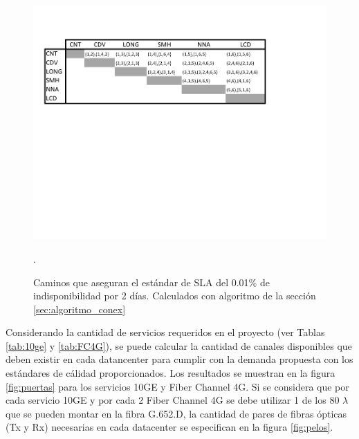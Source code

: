 \begin{figure}[H]
  \centering
  \includegraphics[width=13cm]{Imagenes/caminos.pdf}
  \caption[Caminos calculados por algoritmo de disponibilidad]{Caminos que aseguran el estándar de SLA del 0.01\% de indisponibilidad por 2 días. Calculados con algoritmo de la sección \ref{sec:algoritmo_conex}}.
  \label{fig:caminos}
\end{figure}

Considerando la cantidad de servicios requeridos en el proyecto (ver Tablas \ref{tab:10ge} y \ref{tab:FC4G}), se puede calcular la cantidad de canales disponibles que deben existir en cada datancenter para cumplir con la demanda propuesta con los estándares de cálidad proporcionados. Los resultados se muestran en la figura \ref{fig:puertas} para los servicios 10GE y Fiber Channel 4G. Si se considera que por cada servicio 10GE y por cada 2 Fiber Channel 4G se debe utilizar 1 de los 80 $\lambda$ que se pueden montar en la fibra G.652.D, la cantidad de pares de fibras ópticas (Tx y Rx) necesarias en cada datacenter se especifican en la figura \ref{fig:pelos}.

